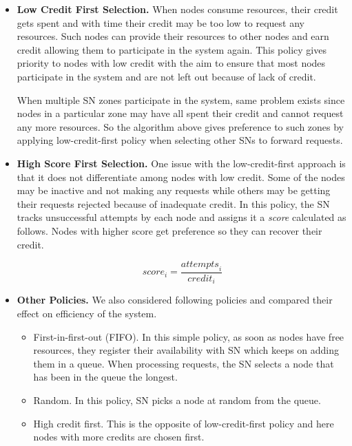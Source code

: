 \begin{itemize}

\item \textbf{Low Credit First Selection.}
When nodes consume resources, their credit gets spent and with time their credit may be too low to request any resources.
Such nodes can provide their resources to other nodes and earn credit allowing them to participate in the system again.
This policy gives priority to nodes with low credit with the aim to ensure that most nodes participate in the system and are not left out because of lack of credit.

When multiple SN zones participate in the system, same problem exists since nodes in a particular zone may have all spent their credit and cannot request any more resources.
So the algorithm above gives preference to such zones by applying low-credit-first policy when selecting other SNs to forward requests.

\item \textbf{High Score First Selection.}
One issue with the low-credit-first approach is that it does not differentiate among nodes with low credit. 
Some of the nodes may be inactive and not making any requests while others may be getting their requests rejected because of inadequate credit. 
In this policy, the SN tracks unsuccessful attempts by each node and assigns it a \emph{score} calculated as follows. Nodes with higher score get preference so they can recover their credit.

\begin{equation}
    {score}_{ i } =   \frac{{attempts}_{ i }}{{credit}_{ i }}  
\end{equation}

\item \textbf{Other Policies.}
We also considered following policies and compared their effect on efficiency of the system.

    \begin{itemize}
        \item First-in-first-out (FIFO). In this simple policy, as soon as nodes have free resources, they register their availability with SN which keeps on adding them in a queue. When processing requests, the SN selects a node that has been in the queue the longest.
        
        \item Random. In this policy, SN picks a node at random from the queue.
        
        \item High credit first. This is the opposite of low-credit-first policy and here nodes with more credits are chosen first.
    \end{itemize}

\end{itemize}

